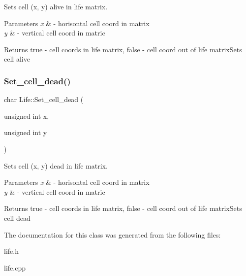 Sets cell (x, y) alive in life matrix. 


\begin{DoxyParams}{Parameters}
{\em x} & -\/ horisontal cell coord in matrix \\
\hline
{\em y} & -\/ vertical cell coord in matric \\
\hline
\end{DoxyParams}
\begin{DoxyReturn}{Returns}
true -\/ cell coords in life matrix, false -\/ cell coord out of life matrix\+Sets cell alive 
\end{DoxyReturn}
\mbox{\label{class_life_ac506a1a9dad0d9fe50eaa7f7c7ffcce4}} 
\subsubsection{\texorpdfstring{Set\+\_\+cell\+\_\+dead()}{Set\_cell\_dead()}}
{\footnotesize\ttfamily char Life\+::\+Set\+\_\+cell\+\_\+dead (\begin{DoxyParamCaption}\item[{unsigned int}]{x,  }\item[{unsigned int}]{y }\end{DoxyParamCaption})}



Sets cell (x, y) dead in life matrix. 


\begin{DoxyParams}{Parameters}
{\em x} & -\/ horisontal cell coord in matrix \\
\hline
{\em y} & -\/ vertical cell coord in matric \\
\hline
\end{DoxyParams}
\begin{DoxyReturn}{Returns}
true -\/ cell coords in life matrix, false -\/ cell coord out of life matrix\+Sets cell dead 
\end{DoxyReturn}


The documentation for this class was generated from the following files\+:\begin{DoxyCompactItemize}
\item 
life.\+h\item 
life.\+cpp\end{DoxyCompactItemize}

